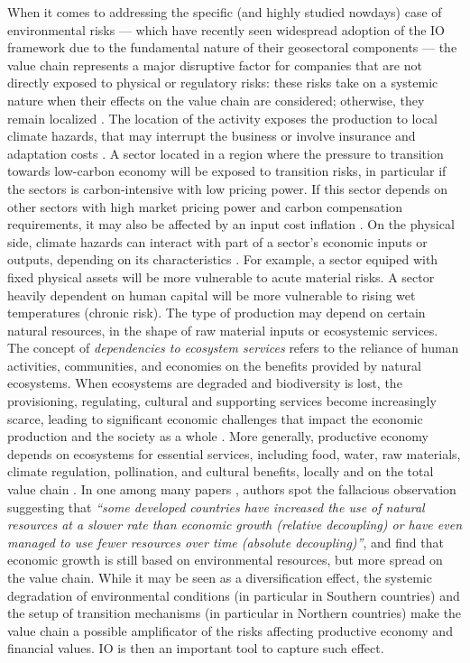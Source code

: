 \documentclass{article}
\begin{document}
When it comes to addressing the specific (and highly studied nowdays) case of environmental risks --- which have recently seen widespread adoption of the IO framework due to the fundamental nature of their geosectoral components --- the value chain represents a major disruptive factor for companies that are not directly exposed to physical or regulatory risks: these risks take on a systemic nature when their effects on the value chain are considered; otherwise, they remain localized \cite{andreoni2015climate}. The location of the activity exposes the production to local climate hazards, that may interrupt the business \cite{watson2024using} or involve insurance and adaptation costs \cite{jarzabkowski2019insurance}. A sector located in a region where the pressure to transition towards low-carbon economy will be exposed to transition risks, in particular if the sectors is carbon-intensive with low pricing power. If this sector depends on other sectors with high market pricing power and carbon compensation requirements, it may also be affected by an input cost inflation \cite{desnos2023climate,pineau2024sectoral}. On the physical side, climate hazards can interact with part of a sector's economic inputs or outputs, depending on its characteristics \cite{schrapffer2024assessing}. For example, a sector equiped with fixed physical assets will be more vulnerable to acute material risks. A sector heavily dependent on human capital will be more vulnerable to rising wet temperatures (chronic risk). The type of production may depend on certain natural resources, in the shape of raw material inputs or ecosystemic services. The concept of \textit{dependencies to ecosystem services} \cite{jax2013ecosystem} refers to the reliance of human activities, communities, and economies on the benefits provided by natural ecosystems. When ecosystems are degraded and biodiversity is lost, the provisioning, regulating, cultural and supporting services become increasingly scarce, leading to significant economic challenges that impact the economic production and the society as a whole \cite{richmond2007valuing}. More generally, productive economy depends on ecosystems for essential services, including food, water, raw materials, climate regulation, pollination, and cultural benefits, locally and on the total value chain \cite{tukker2014global}. In one among many papers \cite{wiedmann2015material}, authors spot the fallacious observation suggesting that \textit{``some developed countries have increased the use of natural resources at a slower rate than economic growth (relative decoupling) or have even managed to use fewer resources over time (absolute decoupling)''}, and find that economic growth is still based on environmental resources, but more spread on the value chain. While it may be seen as a diversification effect, the systemic degradation of environmental conditions (in particular in Southern countries) and the setup of transition mechanisms (in particular in Northern countries) make the value chain a possible amplificator of the risks affecting productive economy and financial values. IO is then an important tool to capture such effect. 
\end{document}
